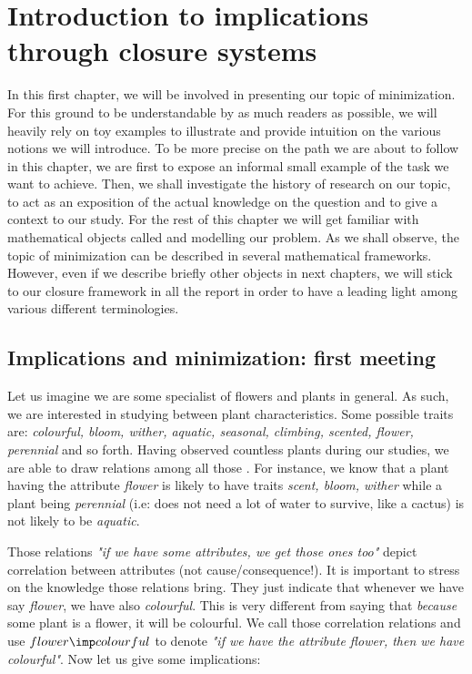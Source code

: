 \chapter{Introduction to implications through closure systems}

In this first chapter, we will be involved in presenting our topic of 
minimization. For this ground to be understandable by as much readers as 
possible, we will heavily rely on toy examples to illustrate and provide 
intuition on the various notions we will introduce. To be more precise on the
path we are about to follow in this chapter, we are first to expose an informal
small example of the task we want to achieve. Then, we shall investigate the
history of research on our topic, to act as an exposition of the actual 
knowledge on the question and to give a context to our study. For the rest of
this chapter we will get familiar with mathematical objects called 
 and  modelling our problem.
As we shall observe, the topic of minimization can be described in several 
mathematical frameworks. However, even if we describe briefly other objects
in next chapters, we will stick to our closure framework in all the report in
order to have a leading light among various different terminologies.

\section{Implications and minimization: first meeting}

Let us imagine we are some specialist of flowers and plants in general. As such,
we are interested in studying  between plant 
characteristics. Some possible traits are: \textit{colourful, bloom, wither, 
aquatic, seasonal, climbing, scented, flower, perennial} and so forth. Having
observed countless plants during our studies, we are able to draw relations
among all those . For instance, we know that a plant having
the attribute \textit{flower} is likely to have traits \textit{scent, bloom, 
wither} while a plant being \textit{perennial} (i.e: does not need a lot of
water to survive, like a cactus) is not likely to be \textit{aquatic}. 

\vspace{1.2em}

Those relations \textit{"if we have some attributes, we get those ones too"}
depict correlation between attributes (not cause/consequence!). It is important
to stress on the knowledge those relations bring. They just indicate that 
whenever we have say \textit{flower}, we have also \textit{colourful}. This is 
very different from saying that \textit{because} some plant is a flower, it 
will be colourful. We call those correlation relations 
and use $ flower \imp colourful$ to denote \textit{"if we have the attribute
flower, then we have colourful"}. Now let us give some implications:

